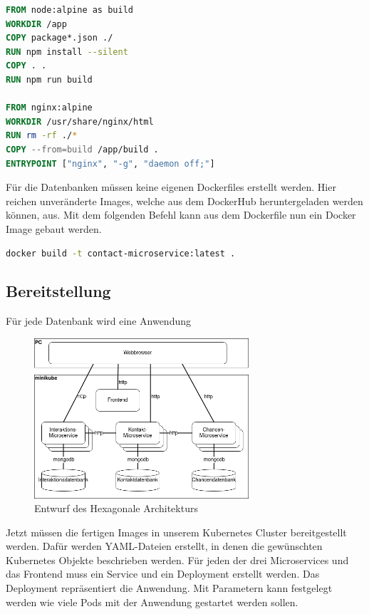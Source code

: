 \begin{lstlisting}[language=dockerfile, caption=Dockerfile für Frontend]
FROM node:alpine as build
WORKDIR /app
COPY package*.json ./
RUN npm install --silent
COPY . .
RUN npm run build

FROM nginx:alpine
WORKDIR /usr/share/nginx/html
RUN rm -rf ./*
COPY --from=build /app/build .
ENTRYPOINT ["nginx", "-g", "daemon off;"]
\end{lstlisting}

Für die Datenbanken müssen keine eigenen Dockerfiles erstellt werden. Hier reichen unveränderte Images, welche aus dem DockerHub heruntergeladen werden können, aus. Mit dem folgenden Befehl kann aus dem Dockerfile nun ein Docker Image gebaut werden.

\begin{lstlisting}[language=bash, caption=Befehl , captionpos=b]
docker build -t contact-microservice:latest .
\end{lstlisting}


\subsection{Bereitstellung}

Für jede Datenbank wird eine Anwendung 

\begin{figure}[H] 
    \centering
    \includegraphics[width=0.71\textwidth]{figures/DeploymentDiagramm.png}
    \caption{Entwurf des \acp{Hexagonale Architektur}}
    \label{fig:CRMENTWURF}
\end{figure}

Jetzt müssen die fertigen Images in unserem Kubernetes Cluster bereitgestellt werden. Dafür werden YAML-Dateien erstellt, in denen die gewünschten Kubernetes Objekte beschrieben werden. Für jeden der drei Microservices und das Frontend muss ein Service und ein Deployment erstellt werden. Das Deployment repräsentiert die Anwendung. Mit Parametern kann festgelegt werden wie viele Pods mit der Anwendung gestartet werden sollen.

